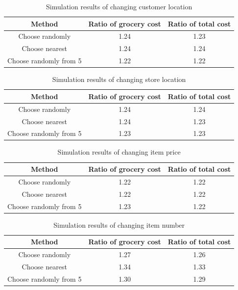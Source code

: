 \begin{table}[!t]

\centering
\caption{Simulation results of changing customer location}
\begin{tabular}{|c|c|c|}
\hline
\textbf{Method} & \textbf{Ratio of grocery cost}& \textbf{Ratio of total cost}\\ \hline
Choose randomly & 1.24 & 1.23\\ \hline
Choose nearest & 1.24 & 1.24\\ \hline
Choose randomly from 5& 1.22 & 1.22\\ \hline
\end{tabular}
\label{ch2:t2}
\end{table}

\begin{table}[!t]
\caption{Simulation results of changing store location}

\centering
\begin{tabular}{|c|c|c|}
\hline
\textbf{Method} & \textbf{Ratio of grocery cost}& \textbf{Ratio of total cost}\\ \hline
 Choose randomly& 1.24& 1.24\\ \hline
 Choose nearest& 1.24& 1.23\\ \hline
 Choose randomly from 5& 1.23& 1.23\\ \hline
\end{tabular}
\label{ch2:t3}
\end{table}

\begin{table}[!t]
\caption{Simulation results of changing item price}

\centering
\begin{tabular}{|c|c|c|}
\hline
\textbf{Method} & \textbf{Ratio of grocery cost}& \textbf{Ratio of total cost}\\ \hline
 Choose randomly& 1.22& 1.22\\ \hline
 Choose nearest& 1.22& 1.22\\ \hline
 Choose randomly from 5& 1.23& 1.22 \\ \hline
\end{tabular}
\label{ch2:t4}
\end{table}

\begin{table}[!t]
\caption{Simulation results of changing item number}

\centering
\begin{tabular}{|c|c|c|}
\hline
\textbf{Method} & \textbf{Ratio of grocery cost}& \textbf{Ratio of total cost}\\ \hline
 Choose randomly& 1.27& 1.26\\ \hline
 Choose nearest& 1.34& 1.33\\ \hline
 Choose randomly from 5& 1.30& 1.29\\ \hline
\end{tabular}
\label{ch2:t5}
\end{table}

